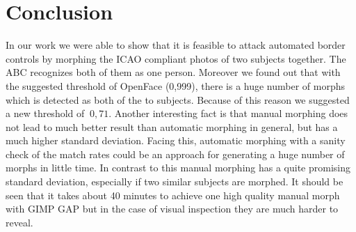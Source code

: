 \section{Conclusion}
\label{Conclusion}
In our work we were able to show that it is feasible to attack automated border controls by morphing the ICAO compliant photos of two subjects together. The ABC recognizes both of them as one person. Moreover we found out that with the suggested threshold of OpenFace (0,999), there is a huge number of morphs which is detected as both of the to subjects. Because of this reason we suggested a new threshold of $~0,71$. 
Another interesting fact is that manual morphing does not lead to much better result than automatic morphing in general, but has a much higher standard deviation. Facing this, automatic morphing with a sanity check of the match rates could be an approach for generating a huge number of morphs in little time. 
In contrast to this manual morphing has a quite promising standard deviation, especially if two similar subjects are morphed. It should be seen that it takes about 40 minutes to achieve one high quality manual morph with GIMP GAP but in the case of visual inspection they are much harder to reveal.
